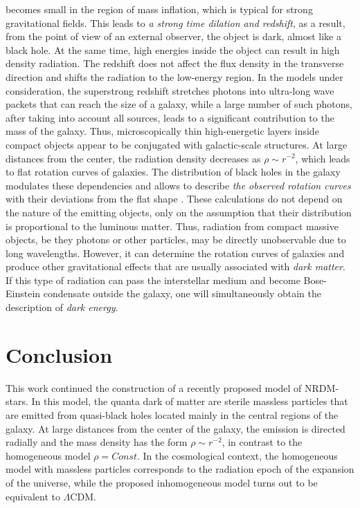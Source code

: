 \documentclass{article}
\begin{document}
becomes small in the region of mass inflation, which is typical for strong gravitational fields. This leads to {\it a strong time dilation and redshift}, as a result, from the point of view of an external observer, the object is dark, almost like a black hole. At the same time, high energies inside the object can result in high density radiation. The redshift does not affect the flux density in the transverse direction and shifts the radiation to the low-energy region. In the models under consideration, the superstrong redshift stretches photons into ultra-long wave packets that can reach the size of a galaxy, while a large number of such photons, after taking into account all sources, leads to a significant contribution to the mass of the galaxy. Thus, microscopically thin high-energetic layers inside compact objects appear to be conjugated with galactic-scale structures. At large distances from the center, the radiation density decreases as $ \rho \sim r ^ {- 2} $, which leads to flat rotation curves of galaxies. The distribution of black holes in the galaxy modulates these dependencies and allows to describe {\it the observed rotation curves} with their deviations from the flat shape \cite {bled2020}. These calculations do not depend on the nature of the emitting objects, only on the assumption that their distribution is proportional to the luminous matter. Thus, radiation from compact massive objects, be they photons or other particles, may be directly unobservable due to long wavelengths. However, it can determine the rotation curves of galaxies and produce other gravitational effects that are usually associated with {\it dark matter}. If this type of radiation can pass the interstellar medium and become Bose-Einstein condensate outside the galaxy, one will simultaneously obtain the description of {\it dark energy}. 

\section{Conclusion}

This work continued the construction of a recently proposed model of NRDM-stars. In this model, the quanta dark of matter are sterile massless particles that are emitted from quasi-black holes located mainly in the central regions of the galaxy. At large distances from the center of the galaxy, the emission is directed radially and the mass density has the form $ \rho \sim r ^ {- 2} $, in contrast to the homogeneous model $ \rho = Const $. In the cosmological context, the homogeneous model with massless particles corresponds to the radiation epoch of the expansion of the universe, while the proposed inhomogeneous model turns out to be equivalent to $ \Lambda $CDM.
\end{document}
